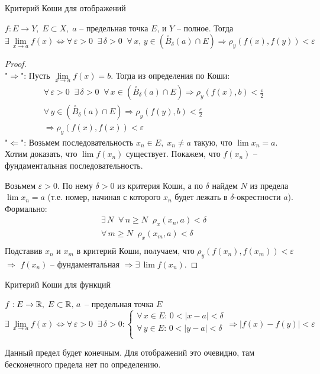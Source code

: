 \begin{theorem-non}
    Критерий Коши для отображений

$f : E \to Y, \; E \subset X, \; a$ -- предельная точка $E$, и $Y$ -- полное. Тогда
\[ \exists \, \lim_{x \to a} f(x) \Longleftrightarrow \forall \, \varepsilon > 0 \;\; \exists \, \delta > 0 \;\; \forall \, x, \, y \in (\overset{\circ}{B}_{\delta}(a) \cap E) \Rightarrow \rho_y(f(x), f(y)) < \varepsilon \]
\end{theorem-non}

\begin{proof} \quad \\
    "$\Rightarrow$": Пусть $\lim\limits_{x \to a} f(x) = b$. Тогда из определения по Коши:
    \begin{gather*}
        \forall \, \varepsilon > 0 \;\; \exists \, \delta > 0 \;\; \forall \, x \in (\overset{\circ}{B}_{\delta}(a) \cap E) \Rightarrow \rho_y(f(x), b) < \frac{\varepsilon}{2} \\
        \forall \, y \in (\overset{\circ}{B}_{\delta}(a) \cap E) \Rightarrow \rho_y(f(y), b) < \frac{\varepsilon}{2} \\
        \Rightarrow \rho_y(f(x), f(x)) < \varepsilon
    \end{gather*}
    "$\Leftarrow$": Возьмем последовательность $x_n \in E, \; x_n \neq a$ такую, что $\lim x_n = a$. Хотим доказать, что $\lim f(x_n)$ существует. Покажем, что $f(x_n)$ -- фундаментальная последовательность.

    Возьмем $\varepsilon > 0$. По нему $\delta > 0$ из критерия Коши, а по $\delta$ найдем $N$ из предела $\lim x_n = a$ (т.е. номер, начиная с которого $x_n$ будет лежать в $\delta$-окрестности $a$). Формально:
    \begin{gather*}
        \exists \, N \;\; \forall \, n \geqslant N \;\; \rho_x(x_n, a) < \delta \\
        \forall \, m \geqslant N \;\; \rho_x(x_m, a) < \delta \\
    \end{gather*}
    Подставив $x_n$ и $x_m$ в критерий Коши, получаем, что $\rho_y(f(x_n), f(x_m)) < \varepsilon$
    $\Rightarrow$ $f(x_n)$ -- фундаментальная $\Rightarrow \exists \, \lim f(x_n)$.
\end{proof}

\begin{theorem-non}
    Критерий Коши для функций

$f : E \to \mathbb{R}, \; E \subset \mathbb{R}, \, a$ -- предельная точка $E$
\[ 
\exists \, \lim_{x \to a} f(x) \Longleftrightarrow \forall \, \varepsilon > 0 \;\; \exists \,\delta > 0 : 
\begin{cases} 
    \forall \, x \in E : \, 0 < |x - a| < \delta \\
    \forall \, y \in E : \, 0 < |y - a| < \delta \\
\end{cases}    
    \Rightarrow |f(x) - f(y)| < \varepsilon
\]
\end{theorem-non}
\begin{notice}
    Данный предел будет конечным. Для отображений это очевидно, там бесконечного предела нет по определению.
\end{notice}

